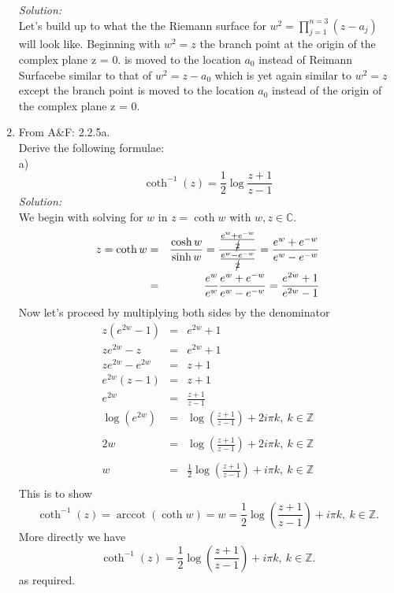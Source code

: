 \documentclass[10pt]{amsart}
\theoremstyle{nonumberplain}
\begin{document}
\begin{enumerate}[label={\bf {\arabic*}:}]
\textit{Solution:} \\
Let's build up to what the the Riemann surface for $w^2=\prod_{j=1}^{n=3}\left(z-a_j\right)$ will look like.
Beginning with $w^2 = z$ the branch point at the origin of the complex plane z = 0.
is moved to the location $a_0$ instead of
Reimann Surfacebe similar to that of $w^2 = z - a_0$ which is yet again similar to $w^2 = z$ except the branch point is moved to the location $a_0$ instead of the origin of the complex plane z = 0.
\item From A\&F: 2.2.5a. \\
Derive the following formulae: \\
a) $$\coth^{-1}(z) = \frac{1}{2}\log\frac{z + 1}{z - 1}$$
\textit{Solution:} \\
We begin with solving for $w$ in $z = \coth{w}$ with $w, z \in \mathbb{C}$. 
\begin{eqnarray*}
z = \coth{w} &=& \frac{\cosh w}{\sinh w} = \frac{ \frac{e^{w} + e^{-w}}{\cancel{2}} }{ \frac{e^{w} - e^{-w}}{\cancel{2}} } = \frac{ e^{w} + e^{-w} }{ e^{w} - e^{-w} } \\
	  &=& \frac{e^{w}}{e^{w}} \frac{ e^{w} + e^{-w} }{ e^{w} - e^{-w} } = \frac{ e^{2w} + 1}{ e^{2w} - 1 }
\end{eqnarray*}
Now let's proceed by multiplying both sides by the denominator
\begin{eqnarray*}
z\left( e^{2w} - 1\right) &=&  e^{2w} + 1\\
ze^{2w} - z &=&  e^{2w} + 1\\
ze^{2w} - e^{2w} &=& z + 1\\
e^{2w}(z - 1) &=& z + 1\\
e^{2w} &=& \frac{z + 1}{z - 1 }\\
\log \left(e^{2w}\right) &=& \log \left(\frac{z + 1}{z - 1} \right) + 2i\pi k, \: k \in \mathbb{Z} \\ \\
2w &=& \log \left(\frac{z + 1}{z - 1} \right) + 2i\pi k, \: k \in \mathbb{Z} \\ \\
w &=& \frac{1}{2}\log \left(\frac{z + 1}{z - 1} \right) + i\pi k, \: k \in \mathbb{Z} \\
\end{eqnarray*}
This is to show
$$\coth^{-1}(z) = \operatorname{arccot}(\coth w) = w = \frac{1}{2}\log \left(\frac{z + 1}{z - 1} \right) + i\pi k, \: k \in \mathbb{Z}.$$
More directly we have 
$$\coth^{-1}(z) = \frac{1}{2}\log \left(\frac{z + 1}{z - 1} \right) + i\pi k, \: k \in \mathbb{Z}.$$
as required. 

\end{enumerate}
\end{document}
